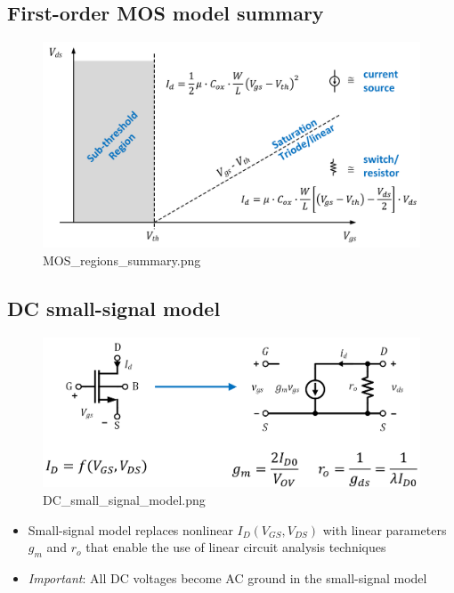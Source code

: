 \documentclass[11pt]{article}
\providecommand{\tightlist}{%
      \setlength{\itemsep}{0pt}\setlength{\parskip}{0pt}}
\begin{document}
    \hypertarget{first-order-mos-model-summary}{%
\subsection{First-order MOS model
summary}\label{first-order-mos-model-summary}}

    \begin{figure}
\centering
\includegraphics{MOS_regions_summary.png}
\caption{MOS\_regions\_summary.png}
\end{figure}

    \hypertarget{dc-small-signal-model}{%
\subsection{DC small-signal model}\label{dc-small-signal-model}}

    \begin{figure}
\centering
\includegraphics{DC_small_signal_model.png}
\caption{DC\_small\_signal\_model.png}
\end{figure}

    \begin{itemize}
\tightlist
\item
  Small-signal model replaces nonlinear \(I_D(V_{GS}, V_{DS})\) with
  linear parameters \(g_m\) and \(r_o\) that enable the use of linear
  circuit analysis techniques
\item
  \emph{Important}: All DC voltages become AC ground in the small-signal
  model
\end{itemize}
\end{document}
